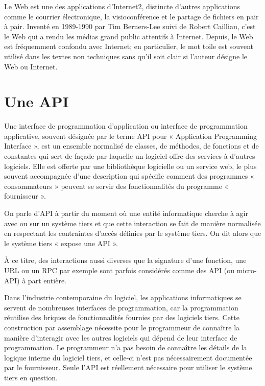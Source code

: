 Le Web est une des applications d’Internet2, distincte d’autres applications comme le courrier
électronique, la visioconférence et le partage de fichiers en pair à pair. Inventé en 1989-1990 par
Tim Berners-Lee suivi de Robert Cailliau, c'est le Web qui a rendu les médias grand public attentifs
à Internet. Depuis, le Web est fréquemment confondu avec Internet; en particulier, le mot toile est
souvent utilisé dans les textes non techniques sans qu'il soit clair si l'auteur désigne le Web ou
Internet.

\section{Une API}\label{subsec:api}
Une interface de programmation d’application\cite{interface_programmation} ou interface de programmation applicative,
souvent désignée par le terme API pour « Application Programming Interface », est un ensemble
normalisé de classes, de méthodes, de fonctions et de constantes qui sert de façade par laquelle un
logiciel offre des services à d'autres logiciels. Elle est offerte par une bibliothèque logicielle ou
un service web, le plus souvent accompagnée d'une description qui spécifie comment des programmes
« consommateurs » peuvent se servir des fonctionnalités du programme « fournisseur ».

On parle d'API à partir du moment où une entité informatique cherche à agir
avec ou sur un système tiers et que cette interaction se fait de manière normalisée en
respectant les contraintes d'accès définies par le système tiers. On dit alors que le système
tiers « expose une API ».

À ce titre, des interactions aussi diverses que la signature d'une fonction, une URL ou un RPC
par exemple sont parfois considérés comme des API (ou micro-API) à part entière.

Dans l'industrie contemporaine du logiciel, les applications informatiques se servent de
nombreuses interfaces de programmation, car la programmation réutilise des briques de
fonctionnalités fournies par des logiciels tiers. Cette construction par assemblage nécessite
pour le programmeur de connaître la manière d’interagir avec les autres logiciels qui dépend
de leur interface de programmation. Le programmeur n'a pas besoin de connaître les détails de
la logique interne du logiciel tiers, et celle-ci n'est pas nécessairement documentée par le
fournisseur. Seule l'API est réellement nécessaire pour utiliser le système tiers en question.

